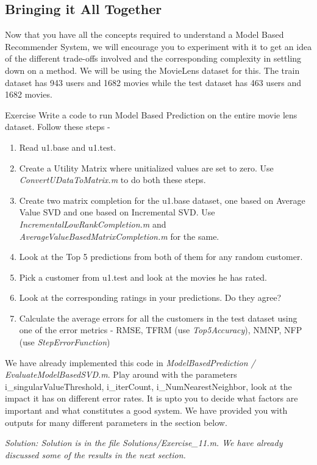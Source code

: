 \begin{enumerate}
  \subsection{Bringing it All Together}
  Now that you have all the concepts required to understand a Model Based Recommender System, we will encourage you to experiment with it to get an idea of the different trade-offs involved and the corresponding complexity in settling down on a method. We will be using the MovieLens dataset for this. The train dataset has 943 users and 1682 movies while the test dataset has 463 users and 1682 movies. 
\begin{myremark}{Exercise }
Write a code to run Model Based Prediction on the entire movie lens dataset. Follow these steps - 
\begin{enumerate}
\item Read u1.base and u1.test. 
\item Create a Utility Matrix where unitialized values are set to zero. Use \textit{ConvertUDataToMatrix.m} to do both these steps.
\item Create two matrix completion for the u1.base dataset, one based on Average Value SVD and one based on Incremental SVD. Use \textit{IncrementalLowRankCompletion.m} and \textit{AverageValueBasedMatrixCompletion.m} for the same.
\item Look at the Top 5 predictions from both of them for any random customer.
\item Pick a customer from u1.test and look at the movies he has rated. 
\item Look at the corresponding ratings in your predictions. Do they agree?
\item Calculate the average errors for all the customers in the test dataset using one of the error metrics - RMSE, TFRM (use \textit{Top5Accuracy}), NMNP, NFP (use \textit{StepErrorFunction})
\end{enumerate}
We have already implemented this code in \textit{ModelBasedPrediction / EvaluateModelBasedSVD.m}. Play around with the parameters {i\_singularValueThreshold, i\_iterCount, i\_NumNearestNeighbor}, look at the impact it has on different error rates. It is upto you to decide what factors are important and what constitutes a good system. We have provided you with outputs for many different parameters in the section below.
\end{myremark}
\textit{Solution: Solution is in the file Solutions/Exercise\_11.m. We have already discussed some of the results in the next section.}


\end{enumerate}
